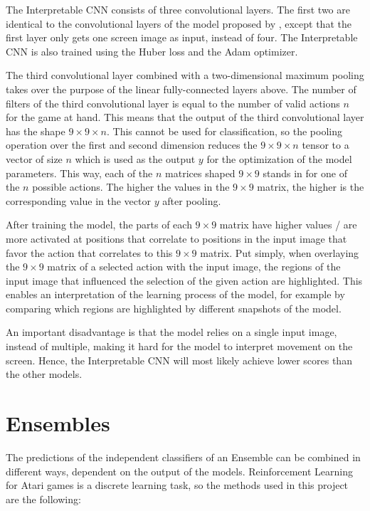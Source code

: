 The Interpretable CNN consists of three convolutional layers. The first two are identical to the convolutional layers of the model proposed by \textcite{mnih_human-level_2015}, except that the first layer only gets one screen image as input, instead of four. The Interpretable CNN is also trained using the Huber loss and the Adam optimizer.

The third convolutional layer combined with a two-dimensional maximum pooling takes over the purpose of the linear fully-connected layers above. The number of filters of the third convolutional layer is equal to the number of valid actions $n$ for the game at hand. This means that the output of the third convolutional layer has the shape $9 \times 9 \times n$. This cannot be used for classification, so the pooling operation over the first and second dimension reduces the $9 \times 9 \times n$ tensor to a vector of size $n$ which is used as the output $y$ for the optimization of the model parameters. This way, each of the $n$ matrices shaped $9 \times 9$ stands in for one of the $n$ possible actions.
The higher the values in the $9 \times 9$ matrix, the higher is the corresponding value in the vector $y$ after pooling.

After training the model, the parts of each $9 \times 9$ matrix have higher values / are more activated at positions that correlate to positions in the input image that favor the action that correlates to this $9 \times 9$ matrix. Put simply, when overlaying the $9 \times 9$ matrix of a selected action with the input image, the regions of the input image that influenced the selection of the given action are highlighted. This enables an interpretation of the learning process of the model, for example by comparing which regions are highlighted by different snapshots of the model.

An important disadvantage is that the model relies on a single input image, instead of multiple, making it hard for the model to interpret movement on the screen. Hence, the Interpretable CNN will most likely achieve lower scores than the other models.

\section{Ensembles}

The predictions of the independent classifiers of an Ensemble can be combined in different ways, dependent on the output of the models. Reinforcement Learning for Atari games is a discrete learning task, so the methods used in this project are the following:

